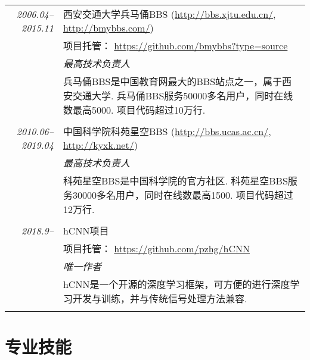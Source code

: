 \documentclass[paper=a4,fontsize=11pt]{scrartcl}
\begin{document}
\begin{tabular}{r|p{11cm}}
	\emph{2006.04--2015.11} & 西安交通大学兵马俑BBS (\href{http://bbs.xjtu.edu.cn/}{http://bbs.xjtu.edu.cn/}, \href{http://bmybbs.com/}{http://bmybbs.com/}) \\
	& 项目托管： \href{https://github.com/bmybbs?type=source}{https://github.com/bmybbs?type=source} \\
	& \emph{最高技术负责人} \\ 
	& \footnotesize{兵马俑BBS是中国教育网最大的BBS站点之一，属于西安交通大学. 兵马俑BBS服务50000多名用户，同时在线数最高5000. 项目代码超过10万行.}\\
	\multicolumn{2}{c}{} \\
	
	
	\emph{2010.06--2019.04} & 中国科学院科苑星空BBS (\href{http://bbs.ucas.ac.cn/}{http://bbs.ucas.ac.cn/}, \href{http://kyxk.net/}{http://kyxk.net/}) \\
	& \emph{最高技术负责人} \\ 
	& \footnotesize{科苑星空BBS是中国科学院的官方社区. 科苑星空BBS服务30000多名用户，同时在线数最高1500. 项目代码超过12万行.}\\
	\multicolumn{2}{c}{} \\
	
	\emph{2018.9--} & hCNN项目 \\
	& 项目托管： \href{https://github.com/pzhg/hCNN}{https://github.com/pzhg/hCNN} \\
	& \emph{唯一作者} \\ 
	& \footnotesize{hCNN是一个开源的深度学习框架，可方便的进行深度学习开发与训练，并与传统信号处理方法兼容.}\\
	\multicolumn{2}{c}{} \\
\end{tabular}






\section*{专业技能}
\end{document}
